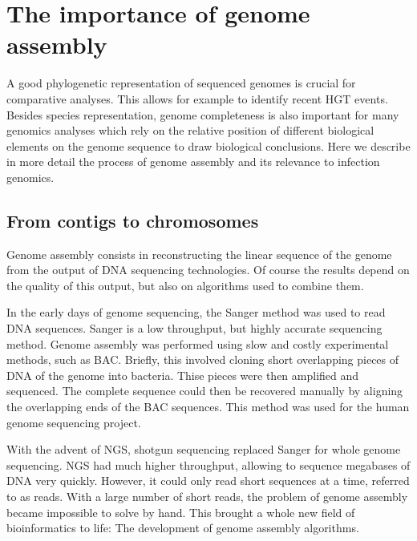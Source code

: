 
\chapter{The importance of genome assembly} %

\label{ch:01-03} %


A good phylogenetic representation of sequenced genomes is crucial for comparative analyses. This allows for example to  identify recent \acrshort{HGT} events. Besides species representation, genome completeness is also important for many genomics analyses which rely on the relative position of different biological elements on the genome sequence to draw biological conclusions. Here we describe in more detail the process of genome assembly and its relevance to infection genomics.

\section{From contigs to chromosomes}
Genome assembly consists in reconstructing the linear sequence of the genome from the output of DNA sequencing technologies. Of course the results depend on the quality of this output, but also on algorithms used to combine them.

In the early days of genome sequencing, the Sanger method was used to read DNA sequences. Sanger is a low throughput, but highly accurate sequencing method. Genome assembly was performed using slow and costly experimental methods, such as \acrfull{BAC}. Briefly, this involved cloning short overlapping pieces of DNA of the genome into bacteria. Thise pieces were then amplified and sequenced. The complete sequence could then be recovered manually by aligning the overlapping ends of the \acrshort{BAC} sequences. This method was used for the human genome sequencing project.

With the advent of \acrfull{NGS}, shotgun sequencing replaced Sanger for whole genome sequencing. \acrshort{NGS} had much higher throughput, allowing to sequence megabases of DNA very quickly. However, it could only read short sequences at a time, referred to as \Gls{read}s. With a large number of short reads, the problem of genome assembly became impossible to solve by hand. This brought a whole new field of bioinformatics to life: The development of genome assembly algorithms.

